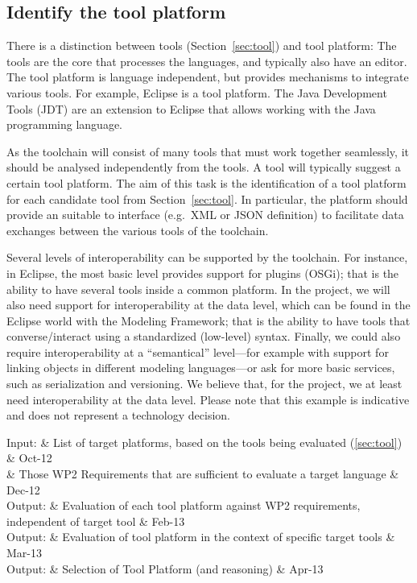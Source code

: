 \documentclass{template/openetcs_article}
\begin{document}
\subsection{Identify the tool platform}
\label{sec:tool_platform}

There is a distinction between tools (Section~\ref{sec:tool}) and tool
platform: The tools are the core that processes the languages, and
typically also have an editor. The tool platform is language
independent, but provides mechanisms to integrate various tools. For
example, Eclipse is a tool platform. The Java Development Tools (JDT)
are an extension to Eclipse that allows working with the Java
programming language.

As the toolchain will consist of many tools that must work together
seamlessly, it should be analysed independently from the tools. A tool
will typically suggest a certain tool platform. The aim of this task
is the identification of a tool platform for each candidate tool from
Section~\ref{sec:tool}. In particular, the platform should provide an
suitable to interface (e.g.~XML or JSON definition) to facilitate data
exchanges between the various tools of the toolchain.

Several levels of interoperability can be supported by the
toolchain. For instance, in Eclipse, the most basic level
provides support for plugins (OSGi); that is the ability to have
several tools inside a common platform. In the project, we will also
need support for interoperability at the data level, which can be
found in the Eclipse world with the Modeling Framework; that is the
ability to have tools that converse/interact using a standardized
(low-level) syntax. Finally, we could also require interoperability at
a ``semantical'' level---for example with support for linking objects
in different modeling languages---or ask for more basic services, such
as serialization and versioning. We believe that, for the project, we
at least need interoperability at the data level.  Please note that this example is indicative and does not represent a technology decision.

\begin{inoutput}
Input: & List of target platforms, based on the tools being evaluated (\ref{sec:tool}) & Oct-12 \\
& Those WP2 Requirements that are sufficient to evaluate a target language & Dec-12 \\
\hline
Output: & Evaluation of each tool platform against WP2 requirements, independent of target tool & Feb-13 \\
Output: & Evaluation of tool platform in the context of specific target tools & Mar-13 \\
Output: & Selection of Tool Platform (and reasoning) & Apr-13 \\
\end{inoutput}
\end{document}
